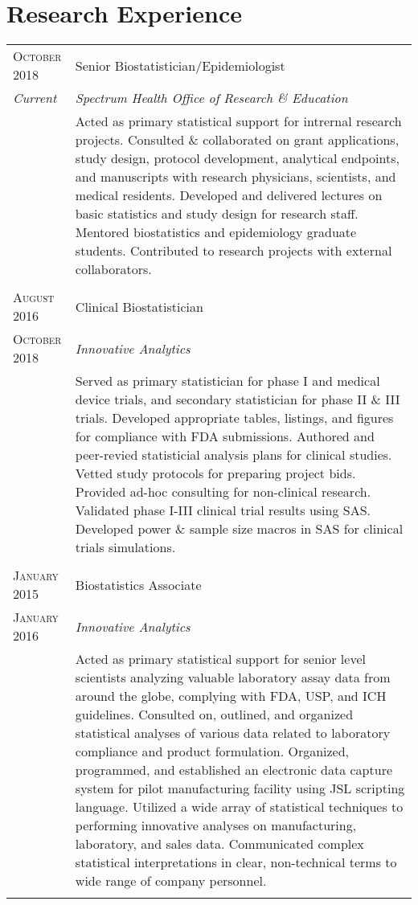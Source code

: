 \documentclass[a4paper,10pt]{article}
\begin{document}
\section{Research Experience}
\begin{tabular}{>{\raggedleft\arraybackslash}p{2.5cm}|p{11cm}}

 \textsc{October 2018} & Senior Biostatistician/Epidemiologist \\
 \emph{Current}&\emph{Spectrum Health Office of Research \& Education}\\&
 \footnotesize{Acted as primary statistical support for intrernal research projects. Consulted \& collaborated on grant applications, study design, protocol development, analytical endpoints, and manuscripts with research physicians, scientists, and medical residents. Developed and delivered lectures on basic statistics and study design for research staff. Mentored biostatistics and epidemiology graduate students. Contributed to research projects with external collaborators. }\\\multicolumn{2}{c}{} \\
 
 
 
 \textsc{August 2016} & Clinical Biostatistician \\ 
 \textsc{October 2018} &\emph{Innovative Analytics}\\ &
 \footnotesize{Served as primary statistician for phase I and medical device trials, and secondary statistician for phase II \& III trials. Developed appropriate tables, listings, and figures for compliance with FDA submissions. Authored and peer-revied statisticial analysis plans for clinical studies. Vetted study protocols for preparing project bids. Provided ad-hoc consulting for non-clinical research. Validated phase I-III clinical trial results using SAS. Developed power \& sample size macros in SAS for clinical trials simulations.}\\\multicolumn{2}{c}{} \\
 
  
 \textsc{January 2015} & Biostatistics Associate \\ 
 \textsc{January 2016} &\emph{Innovative Analytics}\\&
 \footnotesize{ Acted as primary statistical support for senior level scientists analyzing valuable laboratory assay
data from around the globe, complying with FDA, USP, and ICH guidelines. Consulted on, outlined, and organized statistical analyses of various data related to laboratory
compliance and product formulation. Organized, programmed, and established an electronic data capture system for pilot manufacturing
facility using JSL scripting language. Utilized a wide array of statistical techniques to performing innovative analyses on manufacturing,
laboratory, and sales data. Communicated complex statistical interpretations in clear, non-technical terms to wide range of
company personnel.}\\\multicolumn{2}{c}{} \\
 
\end{tabular}
\end{document}
